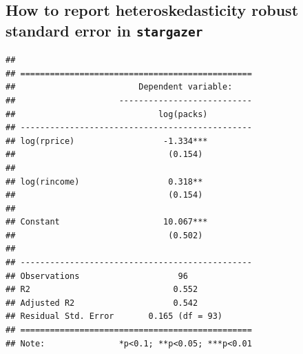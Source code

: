 \documentclass[]{book}
\newenvironment{Shaded}{\begin{snugshade}}{\end{snugshade}}
\newcommand{\KeywordTok}[1]{\textcolor[rgb]{0.13,0.29,0.53}{\textbf{#1}}}
\newcommand{\DataTypeTok}[1]{\textcolor[rgb]{0.13,0.29,0.53}{#1}}
\newcommand{\DecValTok}[1]{\textcolor[rgb]{0.00,0.00,0.81}{#1}}
\newcommand{\StringTok}[1]{\textcolor[rgb]{0.31,0.60,0.02}{#1}}
\newcommand{\CommentTok}[1]{\textcolor[rgb]{0.56,0.35,0.01}{\textit{#1}}}
\newcommand{\OperatorTok}[1]{\textcolor[rgb]{0.81,0.36,0.00}{\textbf{#1}}}
\newcommand{\NormalTok}[1]{#1}
\begin{document}
\subsection{\texorpdfstring{How to report heteroskedasticity robust
standard error in
\texttt{stargazer}}{How to report heteroskedasticity robust standard error in stargazer}}\label{how-to-report-heteroskedasticity-robust-standard-error-in-stargazer}

\begin{Shaded}
\end{Shaded}

\begin{verbatim}
## 
## ===============================================
##                         Dependent variable:    
##                     ---------------------------
##                             log(packs)         
## -----------------------------------------------
## log(rprice)                  -1.334***         
##                               (0.154)          
##                                                
## log(rincome)                  0.318**          
##                               (0.154)          
##                                                
## Constant                     10.067***         
##                               (0.502)          
##                                                
## -----------------------------------------------
## Observations                    96             
## R2                             0.552           
## Adjusted R2                    0.542           
## Residual Std. Error       0.165 (df = 93)      
## ===============================================
## Note:               *p<0.1; **p<0.05; ***p<0.01
\end{verbatim}
\end{document}
